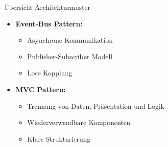 \begin{concept}{Übersicht Architekturmuster}
\begin{itemize}
    \item \textbf{Event-Bus Pattern:}
    \begin{itemize}
        \item Asynchrone Kommunikation
        \item Publisher-Subscriber Modell
        \item Lose Kopplung
    \end{itemize}

    \item \textbf{MVC Pattern:}
    \begin{itemize}
        \item Trennung von Daten, Präsentation und Logik
        \item Wiederverwendbare Komponenten
        \item Klare Strukturierung
    \end{itemize}
\end{itemize}
\end{concept}


